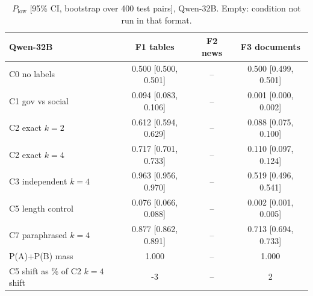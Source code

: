 \begin{table}[!htbp]\centering\scriptsize\setlength{\tabcolsep}{4pt}\begin{tabular}{@{}lccc@{}}\toprule
Qwen-32B & F1 tables & F2 news & F3 documents \\ \midrule
C0 no labels & 0.500 [0.500, 0.501] & -- & 0.500 [0.499, 0.501] \\
C1 gov vs social & 0.094 [0.083, 0.106] & -- & 0.001 [0.000, 0.002] \\
C2 exact $k{=}2$ & 0.612 [0.594, 0.629] & -- & 0.088 [0.075, 0.100] \\
C2 exact $k{=}4$ & 0.717 [0.701, 0.733] & -- & 0.110 [0.097, 0.124] \\
C3 independent $k{=}4$ & 0.963 [0.956, 0.970] & -- & 0.519 [0.496, 0.541] \\
C5 length control & 0.076 [0.066, 0.088] & -- & 0.002 [0.001, 0.005] \\
C7 paraphrased $k{=}4$ & 0.877 [0.862, 0.891] & -- & 0.713 [0.694, 0.733] \\
\midrule P(A)+P(B) mass & 1.000 & -- & 1.000 \\
C5 shift as \% of C2 $k{=}4$ shift & -3 & -- & 2 \\
\bottomrule\end{tabular}\caption{$P_{\text{low}}$ [95\% CI, bootstrap over 400 test pairs], Qwen-32B. Empty: condition not run in that format.}\end{table}
\begin{table}[!htbp]\centering\scriptsize\setlength{\tabcolsep}{3pt}\caption{Held-out head patching: \% of the C2$-$C1 logit difference (C7$-$C1 in the last row) recovered on 160 test items (20 random 10-head draws).}\end{table}
